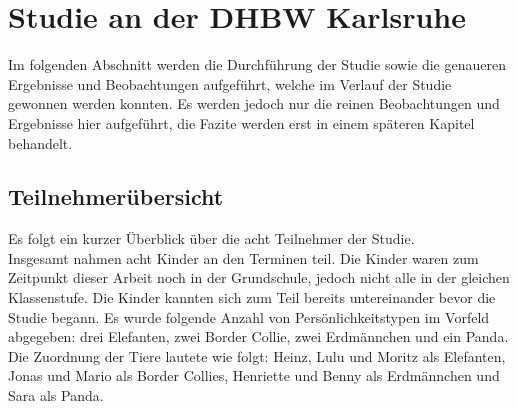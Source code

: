\chapter{Studie an der DHBW Karlsruhe}
	Im folgenden Abschnitt werden die Durchführung der Studie sowie die genaueren Ergebnisse und Beobachtungen aufgeführt, welche im Verlauf der Studie gewonnen werden konnten. Es werden jedoch nur die reinen Beobachtungen und Ergebnisse hier aufgeführt, die Fazite werden erst in einem späteren Kapitel behandelt.
\section{Teilnehmerübersicht}
	Es folgt ein kurzer Überblick über die acht Teilnehmer der Studie.\\
	Insgesamt nahmen acht Kinder an den Terminen teil. Die Kinder waren zum Zeitpunkt dieser Arbeit noch in der Grundschule, jedoch nicht alle in der gleichen Klassenstufe. Die Kinder kannten sich zum Teil bereits untereinander bevor die Studie begann. Es wurde folgende Anzahl von Persönlichkeitstypen im Vorfeld abgegeben: drei Elefanten, zwei Border Collie, zwei Erdmännchen und ein Panda. Die Zuordnung der Tiere lautete wie folgt: Heinz, Lulu und Moritz als Elefanten, Jonas und Mario als Border Collies, Henriette und Benny als Erdmännchen und Sara als Panda.\\
	
